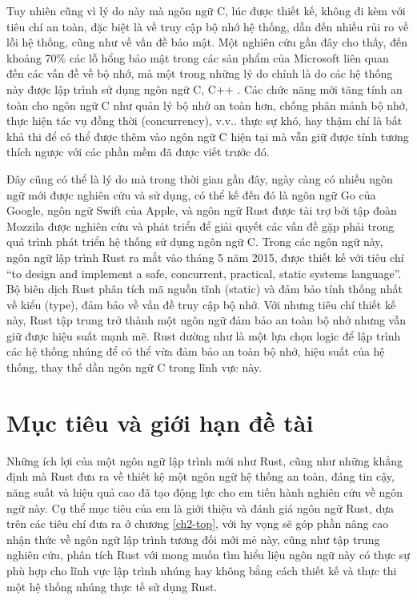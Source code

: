 Tuy nhiên cũng vì lý do này mà ngôn ngữ C, lúc được thiết kế, không đi kèm với tiêu chí an toàn, đặc biệt là về truy cập bộ nhớ hệ thống, dẫn đến nhiều rủi ro về lỗi hệ thống, cũng như về vấn đề bảo mật. Một nghiên cứu gần đây cho thấy, đến khoảng 70\% các lỗ hổng bảo mật trong các sản phẩm của Microsoft liên quan đến các vấn đề về bộ nhớ, mà một trong những lý do chính là do các hệ thống này được lập trình sử dụng ngôn ngữ C, C++ \cite{ms_70}.
Các chức năng mới tăng tính an toàn cho ngôn ngữ C như quản lý bộ nhớ an toàn hơn, chống phân mảnh bộ nhớ, thực hiện tác vụ đồng thời (concurrency), v.v.. thực sự khó, hay thậm chí là bất khả thi để có thể được thêm vào ngôn ngữ C hiện tại mà vẫn giữ được tính tương thích ngược với các phần mềm đã được viết trước đó.

Đây cũng có thể là lý do mà trong thời gian gần đây, ngày càng có nhiều ngôn ngữ mới được nghiên cứu và sử dụng, có thể kế đến đó là ngôn ngữ Go của Google, ngôn ngữ Swift của Apple, và ngôn ngữ Rust được tài trợ bởi tập đoàn Mozzila được nghiên cứu và phát triển để giải quyết các vấn đề gặp phải trong quá trình phát triển hệ thống sử dụng ngôn ngữ C. Trong các ngôn ngữ này, ngôn ngữ lập trình Rust ra mắt vào tháng 5 năm 2015, được thiết kế với tiêu chí ``to design and implement a safe, concurrent, practical, static systems language''. Bộ biên dịch Rust phân tích mã nguồn tĩnh (static) và đảm bảo tính thống nhất về kiểu (type), đảm bảo về vấn đề truy cập bộ nhớ. Với nhưng tiêu chí thiết kế này, Rust tập trung trở thành một ngôn ngữ đảm bảo an toàn bộ nhớ nhưng vẫn giữ được hiệu suất mạnh mẽ. Rust dường như là một lựa chọn logic để lập trình các hệ thống nhúng để có thể vừa đảm bảo an toàn bộ nhớ, hiệu suất của hệ thống, thay thế dần ngôn ngữ C trong lĩnh vực này.

\section{Mục tiêu và giới hạn đề tài}
Những ích lợi của một ngôn ngữ lập trình mới như Rust, cũng như những khẳng định mà Rust đưa ra về thiết kệ một ngôn ngữ hệ thống an toàn, đáng tin cậy, năng suất và hiệu quả cao đã tạo động lực cho em tiến hành nghiên cứu về ngôn ngữ này. Cụ thể mục tiêu của em là giới thiệu và đánh giá ngôn ngữ Rust, dựa trên các tiêu chí đưa ra ở chương \ref{ch2-top}, với hy vọng sẽ góp phần nâng cao nhận thức về ngôn ngữ lập trình tương đối mới mẻ này, cũng như tập trung nghiên cứu, phân tích Rust với mong muốn tìm hiểu liệu ngôn ngữ này có thực sự phù hợp cho lĩnh vực lập trình nhúng hay không bằng cách thiết kế và thực thi một hệ thống nhúng thực tế sử dụng Rust.

